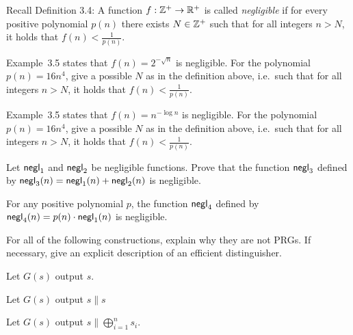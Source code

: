 \documentclass[a4paper,10pt,landscape,twocolumn]{scrartcl}
\begin{document}
\begin{exercise}
Recall Definition 3.4: A function $f: \mathbb{Z}^+ \rightarrow \mathbb{R}^+$ is called \emph{negligible} if for
every positive polynomial $p(n)$ there exists $N \in \mathbb{Z}^+$ such that for all integers $n> N$, it holds that $f(n) < \frac{1}{p(n)}$.

\begin{subex}
Example~3.5 states that $f(n) = 2^{-\sqrt{n}}$ is negligible. For the polynomial $p(n)=16 n^4$, give a possible $N$ as in the definition above, i.e.\ such that for all integers $n > N$, it holds that $f(n) < \frac{1}{p(n)}$.
\end{subex}

\begin{subex}
Example~3.5 states that $f(n) = n^{-\log{n}}$ is negligible. For the polynomial $p(n)=16 n^4$, give a possible $N$ as in the definition above, i.e.\ such that for all integers $n > N$, it holds that $f(n) < \frac{1}{p(n)}$.
\end{subex}

\begin{subex**}
Let $\mathsf{negl}_1$ and $\mathsf{negl}_2$ be negligible functions. Prove that the function $\mathsf{negl}_3$ defined by $\mathsf{negl}_3(n) = \mathsf{negl}_1(n)+\mathsf{negl}_2(n)$ is negligible.
\end{subex**}

\begin{subex**}
For any positive polynomial $p$, the function $\mathsf{negl}_4$ defined
  by $\mathsf{negl}_4(n) = p(n) \cdot \mathsf{negl}_1(n)$ is negligible.
\end{subex**}

\end{exercise}


\begin{exercise}
For all of the following constructions, explain why they are not PRGs. If necessary, give an explicit description of an efficient distinguisher.

\begin{subex}
Let $G(s)$ output $s$.
\end{subex}

\begin{subex}
Let $G(s)$ output $s \| s$
\end{subex}

\begin{subex}
Let $G(s)$ output $s \| \bigoplus_{i=1}^n s_i$.
\end{subex}

\end{exercise}
\end{document}
